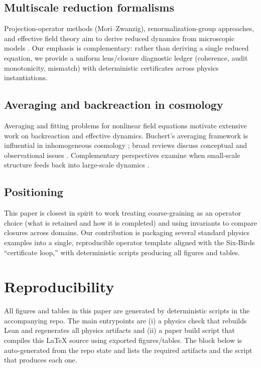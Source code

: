 \documentclass[11pt]{article}
\begin{document}
\subsection{Multiscale reduction formalisms}
\begin{sloppypar}
Projection-operator methods (Mori--Zwanzig), renormalization-group approaches, and effective field theory aim to derive reduced dynamics from microscopic models \citep{zwanzig1961,mori1965,wilsonkogut1974,georgi1993}.
Our emphasis is complementary: rather than deriving a single reduced equation, we provide a uniform lens/closure diagnostic ledger (coherence, audit monotonicity, mismatch) with deterministic certificates across physics instantiations.
\end{sloppypar}

\subsection{Averaging and backreaction in cosmology}
Averaging and fitting problems for nonlinear field equations motivate extensive work on backreaction and effective dynamics. Buchert's averaging framework is influential in inhomogeneous cosmology \citep{buchert2000,buchert2001}; broad reviews discuss conceptual and observational issues \citep{clarkson2011}. Complementary perspectives examine when small-scale structure feeds back into large-scale dynamics \citep{greenwald2011}.

\subsection{Positioning}
This paper is closest in spirit to work treating coarse-graining as an operator choice (what is retained and how it is completed) and using invariants to compare closures across domains. Our contribution is packaging several standard physics examples into a single, reproducible operator template aligned with the Six-Birds ``certificate loop,'' with deterministic scripts producing all figures and tables.
 \section{Reproducibility}
\label{sec:repro}
All figures and tables in this paper are generated by deterministic scripts in the accompanying repo. The main entrypoints are (i) a physics check that rebuilds Lean and regenerates all physics artifacts and (ii) a paper build script that compiles this \LaTeX{} source using exported figures/tables. The block below is auto-generated from the repo state and lists the required artifacts and the script that produces each one.
\end{document}
